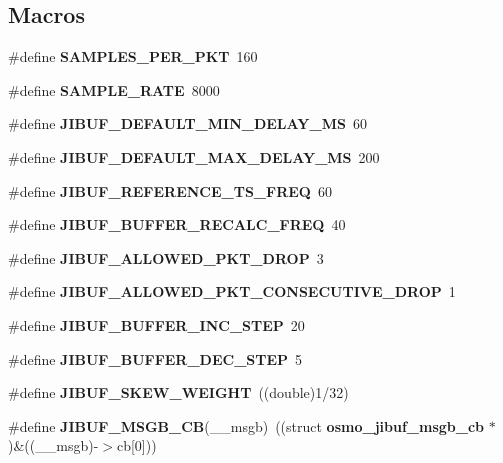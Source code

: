 \subsection*{Macros}
\begin{DoxyCompactItemize}
\item 
\#define {\bfseries S\+A\+M\+P\+L\+E\+S\+\_\+\+P\+E\+R\+\_\+\+P\+KT}~160\label{group__jibuf_gab5ac139064984962fc39032f24689759}

\item 
\#define {\bfseries S\+A\+M\+P\+L\+E\+\_\+\+R\+A\+TE}~8000\label{group__jibuf_ga4b76a0c2859cfd819a343a780070ee2b}

\item 
\#define {\bfseries J\+I\+B\+U\+F\+\_\+\+D\+E\+F\+A\+U\+L\+T\+\_\+\+M\+I\+N\+\_\+\+D\+E\+L\+A\+Y\+\_\+\+MS}~60\label{group__jibuf_gab8733cbd19aa79e877887c282ef4bb82}

\item 
\#define {\bfseries J\+I\+B\+U\+F\+\_\+\+D\+E\+F\+A\+U\+L\+T\+\_\+\+M\+A\+X\+\_\+\+D\+E\+L\+A\+Y\+\_\+\+MS}~200\label{group__jibuf_ga83fc4d5185ca8ff1c8a36ad787773365}

\item 
\#define {\bfseries J\+I\+B\+U\+F\+\_\+\+R\+E\+F\+E\+R\+E\+N\+C\+E\+\_\+\+T\+S\+\_\+\+F\+R\+EQ}~60\label{group__jibuf_ga98f5365acdbe187488dc29d4bf1b2f38}

\item 
\#define {\bfseries J\+I\+B\+U\+F\+\_\+\+B\+U\+F\+F\+E\+R\+\_\+\+R\+E\+C\+A\+L\+C\+\_\+\+F\+R\+EQ}~40\label{group__jibuf_ga919ae3c1b4ed76e5efe2c0c6e52403f7}

\item 
\#define {\bfseries J\+I\+B\+U\+F\+\_\+\+A\+L\+L\+O\+W\+E\+D\+\_\+\+P\+K\+T\+\_\+\+D\+R\+OP}~3\label{group__jibuf_ga8002117af96e70c6095b090a03db296e}

\item 
\#define {\bfseries J\+I\+B\+U\+F\+\_\+\+A\+L\+L\+O\+W\+E\+D\+\_\+\+P\+K\+T\+\_\+\+C\+O\+N\+S\+E\+C\+U\+T\+I\+V\+E\+\_\+\+D\+R\+OP}~1\label{group__jibuf_ga3617ccbb8af0b78b0864f845100b9abb}

\item 
\#define {\bfseries J\+I\+B\+U\+F\+\_\+\+B\+U\+F\+F\+E\+R\+\_\+\+I\+N\+C\+\_\+\+S\+T\+EP}~20\label{group__jibuf_gab6b74faca0c45f42852f275276487352}

\item 
\#define {\bfseries J\+I\+B\+U\+F\+\_\+\+B\+U\+F\+F\+E\+R\+\_\+\+D\+E\+C\+\_\+\+S\+T\+EP}~5\label{group__jibuf_ga92faab8b2e1de77527e20fc0394f9561}

\item 
\#define {\bfseries J\+I\+B\+U\+F\+\_\+\+S\+K\+E\+W\+\_\+\+W\+E\+I\+G\+HT}~((double)1/32)\label{group__jibuf_ga71209ad037c242e1a2ff468a945facf6}

\item 
\#define {\bfseries J\+I\+B\+U\+F\+\_\+\+M\+S\+G\+B\+\_\+\+CB}(\+\_\+\+\_\+msgb)~((struct {\bf osmo\+\_\+jibuf\+\_\+msgb\+\_\+cb} $\ast$)\&((\+\_\+\+\_\+msgb)-\/$>$cb[0]))\label{group__jibuf_gaf07d4d998deea1decf33caa52a18ff40}

\end{DoxyCompactItemize}

